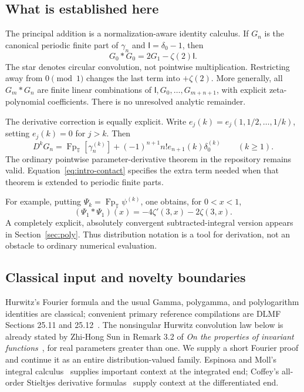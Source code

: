 \documentclass[11pt]{article}
\numberwithin{equation}{section}
\theoremstyle{definition}
\theoremstyle{remark}
\DeclareMathOperator{\Fp}{Fp}
\newcommand{\T}{\mathbb T}
\newcommand{\Id}{\mathsf I}
\begin{document}
\subsection{What is established here}
The principal addition is a normalization-aware identity calculus. If
$G_n$ is the canonical periodic finite part of $\gamma_n$ and
$\Id=\delta_0-1$, then
\begin{equation}\label{eq:intro-first}
 G_0*G_0=2G_1-\zeta(2)\Id.
\end{equation}
The star denotes circular convolution, not pointwise multiplication.
Restricting away from $0\pmod1$ changes the last term into $+\zeta(2)$.
More generally, all $G_m*G_n$ are finite linear combinations of
$\Id,G_0,\ldots,G_{m+n+1}$, with explicit zeta-polynomial coefficients.
There is no unresolved analytic remainder.

The derivative correction is equally explicit. Write
$e_j(k)=e_j(1,1/2,\ldots,1/k)$, setting $e_j(k)=0$ for $j>k$. Then
\begin{equation}\label{eq:intro-contact}
 D^kG_n=\Fp_{\T}[\gamma_n^{(k)}]
       +(-1)^{n+1}n!e_{n+1}(k)\delta_0^{(k)}\qquad(k\ge1).
\end{equation}
The ordinary pointwise parameter-derivative theorem in the repository
remains valid. Equation~\eqref{eq:intro-contact} specifies the extra term
needed when that theorem is extended to periodic finite parts.

For example, putting $\Psi_k=\Fp_{\T}\psi^{(k)}$, one obtains, for $0<x<1$,
\begin{equation}\label{eq:intro-tri}
 (\Psi_1*\Psi_1)(x)=-4\zeta'(3,x)-2\zeta(3,x).
\end{equation}
A completely explicit, absolutely convergent subtracted-integral version
appears in Section~\ref{sec:poly}. Thus distribution notation is a tool
for derivation, not an obstacle to ordinary numerical evaluation.

\subsection{Classical input and novelty boundaries}
Hurwitz's Fourier formula and the usual Gamma, polygamma, and polylogarithm
identities are classical; convenient primary reference compilations are
DLMF Sections 25.11 and 25.12~\cite{DLMFHz,DLMFLi}. The nonsingular
Hurwitz convolution law below is already stated by Zhi-Hong Sun in
Remark 3.2 of \emph{On the properties of invariant functions}~\cite{Sun},
for real parameters greater than one. We supply a short Fourier proof and
continue it as an entire distribution-valued family. Espinosa and Moll's
integral calculus~\cite{EM1,EM2} supplies important context at the integrated
end; Coffey's all-order Stieltjes derivative formulas~\cite{Coffey} supply
context at the differentiated end.
\end{document}
